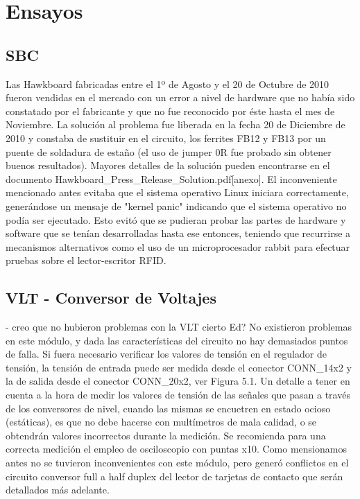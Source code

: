\chapter{Ensayos}

\section{SBC}

\bigskip
\bigskip
Las Hawkboard fabricadas entre el 1º de Agosto y el 20 de Octubre de 2010 fueron vendidas en el mercado con 
un error a nivel de hardware que no había sido constatado por el fabricante y que no fue reconocido por éste
hasta el mes de Noviembre. La solución al problema fue liberada en la fecha 20 de Diciembre de 2010 y constaba de sustituir en el circuito, los ferrites FB12 y FB13 por un puente de soldadura de estaño (el uso de jumper 0R fue probado sin obtener buenos resultados). Mayores detalles de la solución pueden encontrarse en el documento Hawkboard\_Press\_Release\_Solution.pdf[anexo].
El inconveniente mencionado antes evitaba que el sistema operativo Linux iniciara correctamente, generándose un mensaje de "kernel panic" indicando que el sistema operativo no podía ser ejecutado. Esto evitó que se pudieran probar las partes de hardware y software que se tenían desarrolladas hasta ese entonces, teniendo que recurrirse a mecanismos alternativos como el uso de un microprocesador rabbit para efectuar pruebas sobre el lector-escritor RFID.

\section{VLT - Conversor de Voltajes}
- creo que no hubieron problemas con la VLT cierto Ed?
\bigskip
\bigskip
No existieron problemas en este módulo, y dada las características del circuito
no hay demasiados puntos de falla. Si fuera necesario verificar los valores de
tensión en el regulador de tensión, la tensión de entrada puede ser medida desde
el conector CONN\_14x2 y la de salida desde el conector CONN\_20x2, ver Figura 5.1.
Un detalle a tener en cuenta a la hora de medir los valores de tensión de las
señales que pasan a través de los conversores de nivel, cuando las mismas se 
encuetren en estado ocioso (estáticas), es que no debe hacerse con multímetros 
de mala calidad, o se obtendrán valores incorrectos durante la medición. Se 
recomienda para una correcta medición el empleo de osciloscopio con puntas x10. 
Como mensionamos antes no se tuvieron inconvenientes con este módulo, pero generó 
conflictos en el circuito conversor full a half duplex del lector de tarjetas de 
contacto que serán detallados más adelante.


